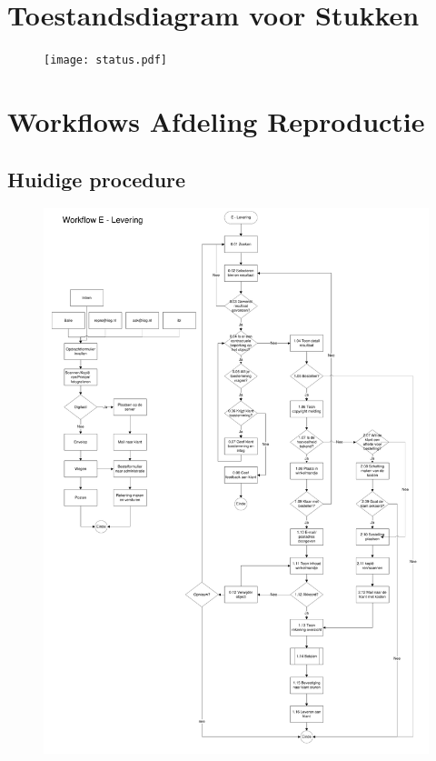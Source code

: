 \documentclass[a4paper,titlepage]{report}
\begin{document}
\printglossary[title=Verklarende Woordenlijst,toctitle=Verklarende Woordenlijst]

\appendix

\chapter{Toestandsdiagram voor Stukken}
\label{a:stuk-state}

\begin{figure}[H]
  \texttt{[image: status.pdf]}
\end{figure}


\chapter{Workflows Afdeling Reproductie}
\label{a:workflows-repro}

\section{Huidige procedure}
\begin{figure}[H]
 \includegraphics[scale=0.7,trim=0mm 400mm 70mm 0mm,page=2]{e-levering.pdf}
\end{figure}
\end{document}
